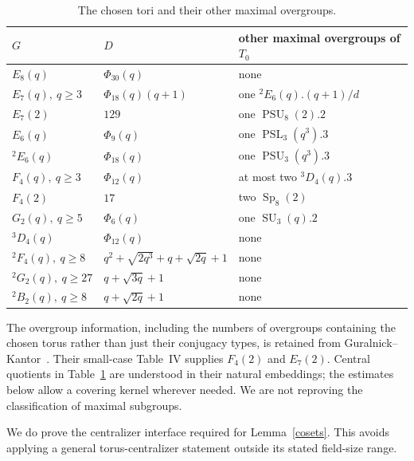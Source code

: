 \documentclass[10pt,a4paper]{article}
\newcommand{\Sp}{\operatorname{Sp}}\newcommand{\SL}{\operatorname{SL}}
\newcommand{\PSL}{\operatorname{PSL}}\newcommand{\PGL}{\operatorname{PGL}}
\begin{document}
\begin{table}[ht]\centering\small
\begin{tabular}{lll}
\toprule
$G$&$D$&other maximal overgroups of $T_0$\\\midrule
$E_8(q)$&$\Phi_{30}(q)$&none\\
$E_7(q),\ q\ge3$&$\Phi_{18}(q)(q+1)$&one ${}^2E_6(q).(q+1)/d$\\
$E_7(2)$&$129$&one $\operatorname{PSU}_8(2).2$\\
$E_6(q)$&$\Phi_9(q)$&one $\PSL_3(q^3).3$\\
$ {}^2E_6(q)$&$\Phi_{18}(q)$&one $\operatorname{PSU}_3(q^3).3$\\
$F_4(q),\ q\ge3$&$\Phi_{12}(q)$&at most two ${}^3D_4(q).3$\\
$F_4(2)$&$17$&two $\Sp_8(2)$\\
$G_2(q),\ q\ge5$&$\Phi_6(q)$&one $\operatorname{SU}_3(q).2$\\
$ {}^3D_4(q)$&$\Phi_{12}(q)$&none\\
$ {}^2F_4(q),\ q\ge8$&$q^2+\sqrt{2q^3}+q+\sqrt{2q}+1$&none\\
$ {}^2G_2(q),\ q\ge27$&$q+\sqrt{3q}+1$&none\\
$ {}^2B_2(q),\ q\ge8$&$q+\sqrt{2q}+1$&none\\\bottomrule
\end{tabular}
\caption{The chosen tori and their other maximal overgroups.}
\label{tori}
\end{table}

The overgroup information, including the numbers of overgroups containing
the chosen torus rather than just their conjugacy types, is retained from
Guralnick--Kantor~\cite[Propositions~6.1--6.2 and their proofs]{GK}.
Their small-case Table~IV supplies $F_4(2)$ and $E_7(2)$.
Central quotients in Table~\ref{tori} are understood in their natural
embeddings; the estimates below allow a covering kernel wherever needed.
We are not reproving the classification of maximal subgroups.

We do prove the centralizer interface required for Lemma~\ref{cosets}.
This avoids applying a general torus-centralizer statement outside its
stated field-size range.
\end{document}
